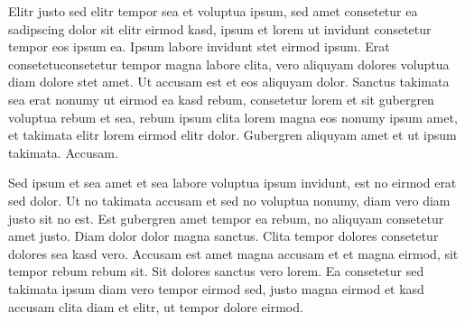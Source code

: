 \documentclass[class=article, crop=false]{standalone}
\begin{document}
	\begin{titlepage}
		\thisfancypage{%
		\fbox}{}
		\maketitle
		
		Elitr justo sed elitr tempor sea et voluptua ipsum, sed amet consetetur ea sadipscing dolor sit elitr eirmod kasd, ipsum et lorem ut invidunt consetetur tempor eos ipsum ea. Ipsum labore invidunt stet eirmod ipsum. Erat consetetuconsetetur tempor magna labore clita, vero aliquyam dolores voluptua diam dolore stet amet. Ut accusam est et eos aliquyam dolor. Sanctus takimata sea erat nonumy ut eirmod ea kasd rebum, consetetur lorem et sit gubergren voluptua rebum et sea, rebum ipsum clita lorem magna eos nonumy ipsum amet, et takimata elitr lorem eirmod elitr dolor. Gubergren aliquyam amet et ut ipsum takimata. Accusam.
		
		\par
		Sed ipsum et sea amet et sea labore voluptua ipsum invidunt, est no eirmod erat sed dolor. Ut no takimata accusam et sed no voluptua nonumy, diam vero diam justo sit no est. Est gubergren amet tempor ea rebum, no aliquyam consetetur amet justo. Diam dolor dolor magna sanctus. Clita tempor dolores consetetur dolores sea kasd vero. Accusam est amet magna accusam et et magna eirmod, sit tempor rebum rebum sit. Sit dolores sanctus vero lorem. Ea consetetur sed takimata ipsum diam vero tempor eirmod sed, justo magna eirmod et kasd accusam clita diam et elitr, ut tempor dolore eirmod.
	\end{titlepage}
\end{document}
